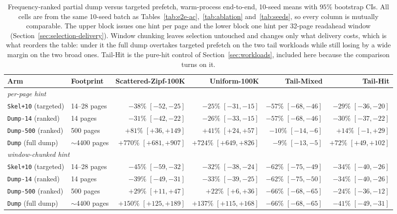\documentclass[sigconf, nonacm]{acmart}
\begin{document}
\begin{table}[htbp]
\centering
\caption{Frequency-ranked partial dump versus targeted prefetch, warm-process end-to-end, 10-seed means with $95\%$ bootstrap CIs. All cells are from the same 10-seed batch as Tables~\ref{tab:e2e-ac},~\ref{tab:ablation} and~\ref{tab:seeds}, so every column is mutually comparable. The upper block issues one hint per page and the lower block one hint per 32-page readahead window (Section~\ref{sec:selection-delivery}). Window chunking leaves selection untouched and changes only what delivery costs, which is what reorders the table: under it the full dump overtakes targeted prefetch on the two tail workloads while still losing by a wide margin on the two broad ones. Tail-Hit is the pure-hit control of Section~\ref{sec:workloads}, included here because the comparison turns on it.}
\begin{tabular}{l l r r r r}
\toprule
\textbf{Arm} & \textbf{Footprint} & \textbf{Scattered-Zipf-100K} & \textbf{Uniform-100K} & \textbf{Tail-Mixed} & \textbf{Tail-Hit} \\
\midrule
\multicolumn{6}{l}{\textit{per-page hint}} \\
\texttt{Skel+10} (targeted) & 14--28 pages & $-38\%$ $[-52, -25]$ & $-25\%$ $[-31, -15]$ & $-57\%$ $[-68, -46]$ & $-29\%$ $[-36, -20]$ \\
\texttt{Dump-14} (ranked) & 14 pages & $-31\%$ $[-42, -22]$ & $-26\%$ $[-33, -15]$ & $-57\%$ $[-68, -46]$ & $-30\%$ $[-37, -22]$ \\
\texttt{Dump-500} (ranked) & 500 pages & $+81\%$ $[+36, +149]$ & $+41\%$ $[+24, +57]$ & $-10\%$ $[-14, -6]$ & $+14\%$ $[-1, +29]$ \\
\texttt{Dump} (full dump) & $\sim$4400 pages & $+770\%$ $[+681, +907]$ & $+724\%$ $[+649, +826]$ & $-9\%$ $[-13, -5]$ & $+72\%$ $[+49, +102]$ \\
\midrule
\multicolumn{6}{l}{\textit{window-chunked hint}} \\
\texttt{Skel+10} (targeted) & 14--28 pages & $-45\%$ $[-59, -32]$ & $-32\%$ $[-38, -24]$ & $-62\%$ $[-75, -49]$ & $-34\%$ $[-40, -26]$ \\
\texttt{Dump-14} (ranked) & 14 pages & $-39\%$ $[-49, -31]$ & $-33\%$ $[-39, -25]$ & $-62\%$ $[-75, -50]$ & $-34\%$ $[-40, -26]$ \\
\texttt{Dump-500} (ranked) & 500 pages & $+29\%$ $[+11, +47]$ & $+22\%$ $[+6, +36]$ & $-66\%$ $[-68, -65]$ & $-24\%$ $[-36, -12]$ \\
\texttt{Dump} (full dump) & $\sim$4400 pages & $+150\%$ $[+125, +189]$ & $+137\%$ $[+115, +168]$ & $-66\%$ $[-68, -65]$ & $-41\%$ $[-49, -31]$ \\
\bottomrule
\end{tabular}
\label{tab:competitive}
\end{table}
\end{document}
